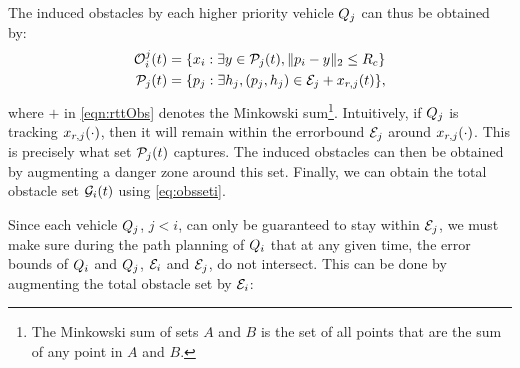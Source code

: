 %

The induced obstacles by each higher priority vehicle $Q_j$ can thus be obtained by: 
\begin{equation} 
\label{eqn:rttObs}
\begin{aligned}
\ioset_i^j(t) &=  \{\state_i: \exists y \in \pfrs_j(t), \|\pos_i - y\|_2 \le \rc \} \\
\pfrs_j(t) &= \{\pos_j: \exists \npos_j, (\pos_j, \npos_j) \in \errorbound_j + \state_{r,j}(t) \},
\end{aligned}
\end{equation}
where $+$ in \eqref{eqn:rttObs} denotes the Minkowski sum\footnote{The Minkowski sum of sets $A$ and $B$ is the set of all points that are the sum of any point in $A$ and $B$.}. Intuitively, if $Q_j$ is tracking $x_{r,j}(\cdot)$, then it will remain within the errorbound $\mathcal{E}_j$ around $x_{r,j}(\cdot)$. This is precisely what set $\mathcal{P}_j(t)$ captures. The induced obstacles can then be obtained by augmenting a danger zone around this set. Finally, we can obtain the total obstacle set $\mathcal{G}_i(t)$ using \eqref{eq:obsseti}. 

Since each vehicle $Q_j$, $j<i$, can only be guaranteed to stay within $\mathcal{E}_j$, we must make sure during the path planning of $Q_i$ that at any given time, the error bounds of $Q_i$ and $Q_j$, $\mathcal{E}_i$ and $\mathcal{E}_j$, do not intersect. This can be done by augmenting the total obstacle set by $\mathcal{E}_i$:%


